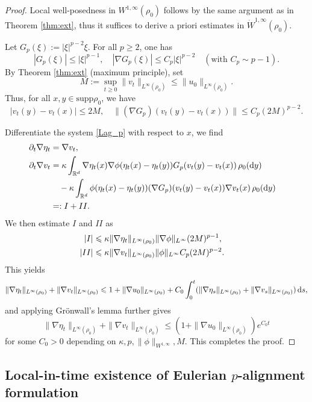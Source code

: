 \documentclass[10pt,reqno]{amsart}
\renewcommand{\ge}{\geqslant}
\renewcommand{\leq}{\leqslant}
\renewcommand{\le}{\leqslant}
\numberwithin{equation}{section}
\newcommand{\R}{\mathbb R}
\newcommand{\pa}{\partial}
\newcommand{\intr}{\int_{\R^d}}
\newcommand{\dy}{\textnormal{d}y}
\newcommand{\ds}{\textnormal{d}s}
\newcommand{\supp}{\text{supp}}
\begin{document}
\begin{proof}
Local well-posedness in $W^{1,\infty}(\rho_0)$ follows by the same argument as in Theorem \ref{thm:ext}, thus it suffices to derive a priori estimates in  $\dot W^{1,\infty}(\rho_0)$.

Let $G_p(\xi):=|\xi|^{p-2}\xi$. For all $p\ge2$, one has
\[
|G_p(\xi)|\le |\xi|^{p-1},\quad |\nabla G_p(\xi)|\le C_p |\xi|^{p-2}\quad(\text{with }C_p\sim p-1).
\]
By Theorem \ref{thm:ext} (maximum principle), set 
\[
M:=\sup_{t\ge0}\|v_t\|_{L^\infty(\rho_0)}\le \|u_0\|_{L^\infty(\rho_0)}. 
\]
Thus, for all $x,y \in \supp \rho_0$, we have
\[
 |v_t(y)-v_t(x)|\le 2M, \quad \|(\nabla G_p)(v_t(y)-v_t(x))\|\le C_p (2M)^{p-2}.
\]

Differentiate the system \eqref{Lag_p} with respect to $x$, we find
\begin{align}\label{LA_grad}
\begin{aligned}
\pa_t \nabla \eta_t &= \nabla v_t, \cr
\pa_t \nabla v_t &= \kappa \intr \nabla \eta_t(x) \nabla\phi(\eta_t(x) - \eta_t(y)) G_p(v_t(y) - v_t(x))\,\rho_0(\dy) \cr
&\quad - \kappa \intr \phi(\eta_t(x) - \eta_t(y)) (\nabla G_p)(v_t(y) - v_t(x)) \nabla v_t(x)\,\rho_0(\dy)\cr
&=: I + II.
\end{aligned}
\end{align}
We then estimate $I$ and $II$ as
\begin{align*}
| I | &\leq \kappa \|\nabla \eta_t\|_{L^\infty(\rho_0)}\|\nabla \phi\|_{L^\infty} (2M)^{p-1},\cr
| II | &\leq \kappa \|\nabla v_t\|_{L^\infty(\rho_0)} \|\phi\|_{L^\infty} C_p (2M)^{p-2}.
\end{align*}
This yields
\[
\|\nabla \eta_t \|_{L^\infty(\rho_0)} +  \|\nabla v_t\|_{L^\infty(\rho_0)} \leq 1 + \|\nabla u_0\|_{L^\infty(\rho_0)} + C_0\int_0^t (\|\nabla \eta_s \|_{L^\infty(\rho_0)} +  \|\nabla v_s\|_{L^\infty(\rho_0)})\,\ds,
\]
and applying Gr\"onwall's lemma further gives
\[
\|\nabla \eta_t \|_{L^\infty(\rho_0)} +  \|\nabla v_t\|_{L^\infty(\rho_0)} \leq (1 + \|\nabla u_0\|_{L^\infty(\rho_0)}) e^{C_0 t}
\]
for some $C_0 > 0$ depending on $\kappa, p, \|\phi\|_{W^{1,\infty}}, M$. This completes the proof.
\end{proof}

%
%
%                      
%
%
 
\subsection{Local-in-time existence of Eulerian $p$-alignment formulation}  
\end{document}

